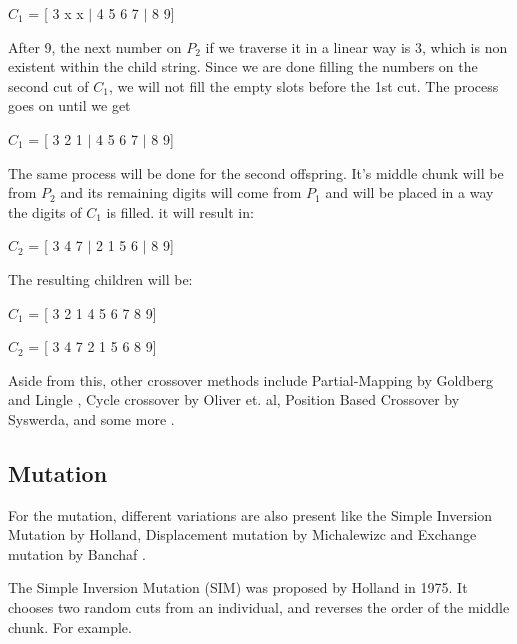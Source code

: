 \hfill \par 
$C_{1}$ = [ 3 x x $|$ 4 5 6 7 $|$ 8 9] \par 
\hfill \par
After 9, the next number on $P_2$ if we traverse it in a linear way is 3, which is non existent within the child string. Since we are done filling the numbers on the second cut of $C_1$, we will not fill the empty slots before the 1st cut. The process goes on until we get \par 
\hfill \par 
$C_{1}$ = [ 3 2 1 $|$ 4 5 6 7 $|$ 8 9] \par 
\hfill \par 
The same process will be done for the second offspring. It's middle chunk will be from $P_2$ and its remaining digits will come from $P_1$ and will be placed in a way the digits of $C_1$ is filled. it will result in:
\hfill \par 
$C_{2}$ = [ 3 4 7 $|$ 2 1 5 6 $|$ 8 9] \par

\hfill \par 

The resulting children will be:
\hfill \par
$C_{1}$ = [ 3 2 1 4 5 6 7 8 9] \par 
$C_{2}$ = [ 3 4 7 2 1 5 6 8 9] \par 
\hfill \par 
Aside from this, other crossover methods include Partial-Mapping by Goldberg and Lingle , Cycle crossover by Oliver et. al, Position Based Crossover by Syswerda, and some more \cite{larranaga1999genetic}.


\subsection{Mutation}
\label{GaMutation}
\indent \indent For the mutation, different variations are also present like the Simple Inversion Mutation by Holland, Displacement mutation by Michalewizc and Exchange mutation by Banchaf \cite{larranaga1999genetic}.\par 

\hfill \par 

The Simple Inversion Mutation (SIM) \cite{larranaga1999genetic} was proposed by Holland in 1975. It chooses two random cuts from an individual, and reverses the order of the middle chunk. For example. \par 
\hfill \par 

